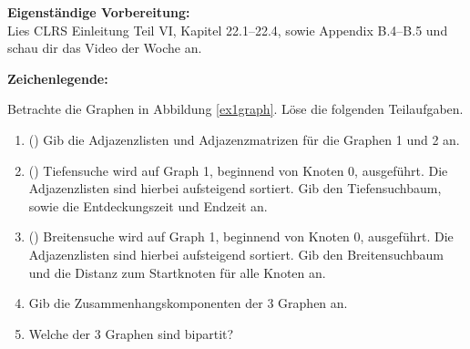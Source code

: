 \documentclass{uebung_cs}
\begin{document}
\textbf{Eigenständige Vorbereitung:}\\
Lies  CLRS Einleitung Teil VI, Kapitel 22.1--22.4, sowie Appendix B.4--B.5 und schau dir das  Video der Woche an.

\textbf{Zeichenlegende:}
\legende{}


\begin{aufgabe}\label{tue-first}
	Betrachte die Graphen in Abbildung \ref{ex1graph}.
	Löse die folgenden Teilaufgaben.
	\begin{enumerate}
		\item (\warmup) Gib die Adjazenzlisten und Adjazenzmatrizen für die Graphen 1 und 2 an.
		\item (\warmup) Tiefensuche wird auf Graph 1, beginnend von Knoten 0, ausgeführt.
		Die Adjazenzlisten sind hierbei aufsteigend sortiert.
		Gib den Tiefensuchbaum, sowie die Entdeckungszeit und Endzeit an.
		\item (\warmup) Breitensuche wird auf Graph 1, beginnend von Knoten 0, ausgeführt.
		Die Adjazenzlisten sind hierbei aufsteigend sortiert.
		Gib den Breitensuchbaum und die Distanz zum Startknoten für alle Knoten an.
		\item Gib die Zusammenhangskomponenten der 3 Graphen an.
		\item Welche der 3 Graphen sind bipartit?
	\end{enumerate}
\end{aufgabe}
\end{document}
